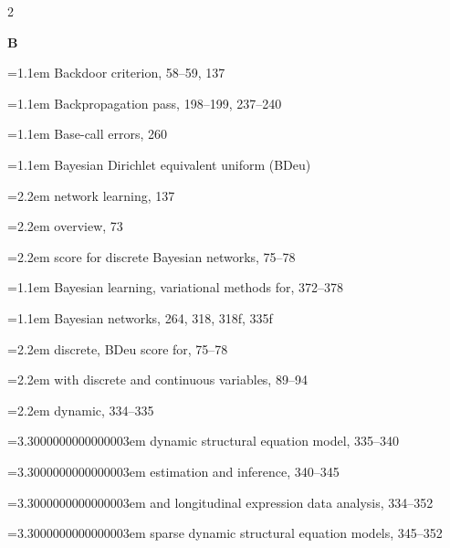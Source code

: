 \begin{multicols}{2}
\par{}\medskip\noindent\textbf{B}\par\nobreak\smallskip\nobreak
\noindent\hangindent=1.1em Backdoor criterion, 58--59, 137\par
\noindent\hangindent=1.1em Backpropagation pass, 198--199, 237--240\par
\noindent\hangindent=1.1em Base-call errors, 260\par
\noindent\hangindent=1.1em Bayesian Dirichlet equivalent uniform (BDeu)\par
\noindent\hangindent=2.2em \hspace*{1.1em}network learning, 137\par
\noindent\hangindent=2.2em \hspace*{1.1em}overview, 73\par
\noindent\hangindent=2.2em \hspace*{1.1em}score for discrete Bayesian networks, 75--78\par
\noindent\hangindent=1.1em Bayesian learning, variational methods for, 372--378\par
\noindent\hangindent=1.1em Bayesian networks, 264, 318, 318f, 335f\par
\noindent\hangindent=2.2em \hspace*{1.1em}discrete, BDeu score for, 75--78\par
\noindent\hangindent=2.2em \hspace*{1.1em}with discrete and continuous variables, 89--94\par
\noindent\hangindent=2.2em \hspace*{1.1em}dynamic, 334--335\par
\noindent\hangindent=3.3000000000000003em \hspace*{2.2em}dynamic structural equation model, 335--340\par
\noindent\hangindent=3.3000000000000003em \hspace*{2.2em}estimation and inference, 340--345\par
\noindent\hangindent=3.3000000000000003em \hspace*{2.2em}and longitudinal expression data analysis, 334--352\par
\noindent\hangindent=3.3000000000000003em \hspace*{2.2em}sparse dynamic structural equation models, 345--352\par

\end{multicols}
